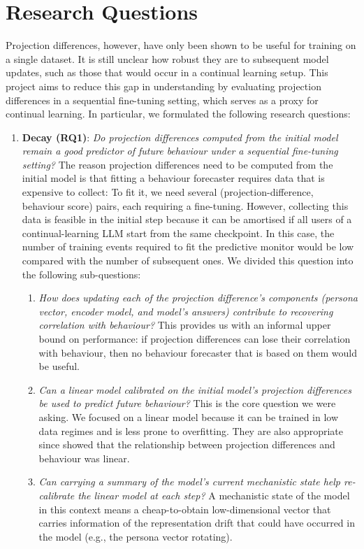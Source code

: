 \section{Research Questions}
Projection differences, however, have only been shown to be useful for training on a single dataset. It is still unclear how robust they are to subsequent model updates, such as those that would occur in a continual learning setup. This project aims to reduce this gap in understanding by evaluating projection differences in a sequential fine-tuning setting, which serves as a proxy for continual learning. In particular, we formulated the following research questions:
\begin{enumerate}
    \item \textbf{Decay (RQ1)}: \textit{Do projection differences computed from the initial model remain a good predictor of future behaviour under a sequential fine-tuning setting?} The reason projection differences need to be computed from the initial model is that fitting a behaviour forecaster requires data that is expensive to collect: To fit it, we need several (projection-difference, behaviour score) pairs, each requiring a fine-tuning. However, collecting this data is feasible in the initial step because it can be amortised if all users of a continual-learning LLM start from the same checkpoint. In this case, the number of training events required to fit the predictive monitor would be low compared with the number of subsequent ones. We divided this question into the following sub-questions:
    \begin{enumerate}
        \item \textit{How does updating each of the projection difference's components (persona vector, encoder model, and model's answers) contribute to recovering correlation with behaviour?} This provides us with an informal upper bound on performance: if projection differences can lose their correlation with behaviour, then no behaviour forecaster that is based on them would be useful. 
        \item \textit{Can a linear model calibrated on the initial model's projection differences be used to predict future behaviour?} This is the core question we were asking. We focused on a linear model because it can be trained in low data regimes and is less prone to overfitting. They are also appropriate since \citet{chen2025persona_vectors} showed that the relationship between projection differences and behaviour was linear.
        \item \textit{Can carrying a summary of the model's current mechanistic state help re-calibrate the linear model at each step?} A mechanistic state of the model in this context means a cheap-to-obtain low-dimensional vector that carries information of the representation drift that could have occurred in the model (e.g., the persona vector rotating). 

\end{enumerate}
\end{enumerate}
